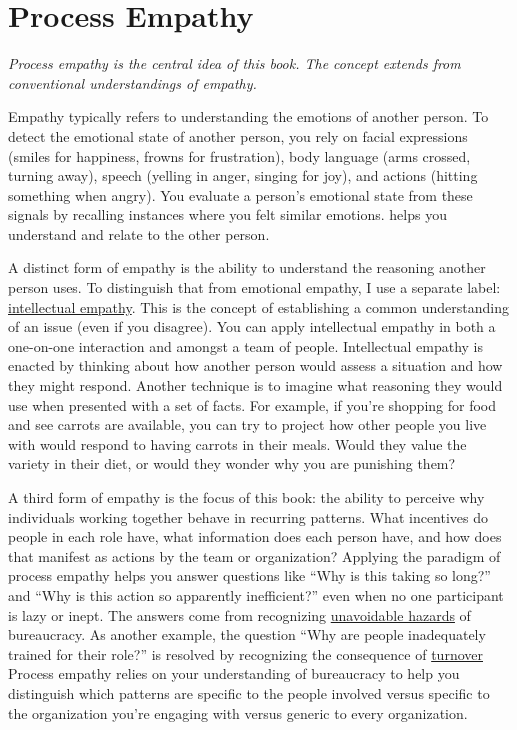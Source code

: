 \section{Process Empathy\label{sec:process-empathy}}

\textit{Process empathy is the central idea of this book. The concept extends from conventional understandings of empathy.}

Empathy typically refers to understanding the emotions of another person. To detect the emotional state of another person, you rely on facial expressions (smiles for happiness, frowns for frustration), body language (arms crossed, turning away), speech (yelling in anger, singing for joy), and actions (hitting something when angry). You evaluate a person's emotional state from these signals by recalling instances where you felt similar emotions. 
\iftoggle{glossarysubstitutionworks}{\Gls{emotional empathy}}{Emotional empathy} 
helps you understand and relate to the other person. 

A distinct form of empathy is the ability to understand the reasoning another person uses. 
To distinguish that from emotional empathy, I use a separate label: %
\hyperref[sec:intellectual-empathy]{intellectual empathy}.
This is the concept of establishing a common understanding of an issue (even if you disagree). You can apply intellectual empathy in both a one-on-one interaction and amongst a team of people. Intellectual empathy is enacted by thinking about how another person would assess a situation and how they might respond. Another technique is to imagine what reasoning they would use when presented with a set of facts. For example, if you're shopping for food and see carrots are available, you can try to project how other people you live with would respond to having carrots in their meals. Would they value the variety in their diet, or would they wonder why you are punishing them?


A third form of empathy is the focus of this book: the ability to perceive why individuals working together behave in recurring patterns. What incentives do people in each role have, what information does each person have, and how does that manifest as actions by the team or organization? Applying the paradigm of \gls{process empathy} 
\iftoggle{glossaryinmargin}{\marginpar{[Glossary]}}{}%
helps you answer questions like ``Why is this taking so long?'' and ``Why is this action so apparently inefficient?'' even when no one participant is lazy or inept. The answers come from recognizing 
\hyperref[sec:unavoidable-hazards]{unavoidable hazards}\iftoggle{haspagenumbers}{ (see page~\pageref{sec:unavoidable-hazards})}{}
of bureaucracy. As another example, the question ``Why are people inadequately trained for their role?'' is resolved by recognizing the consequence of 
\hyperref[sec:turnover]{turnover}\iftoggle{haspagenumbers}{ (see page~\pageref{sec:turnover}).}{.}
Process empathy relies on your understanding of bureaucracy to help you distinguish which patterns are specific to the people involved versus specific to the organization you're engaging with versus generic to every organization.

